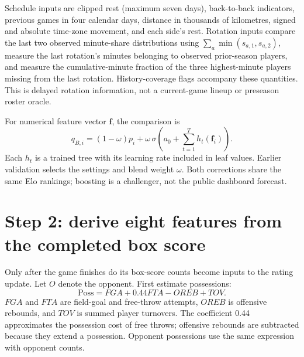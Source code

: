 \documentclass[11pt]{article}
\begin{document}
Schedule inputs are clipped rest (maximum seven days), back-to-back
indicators, previous games in four calendar days, distance in thousands of
kilometres, signed and absolute time-zone movement, and each side's rest.
Rotation inputs compare the last two observed minute-share distributions
using $\sum_a\min(s_{a,1},s_{a,2})$, measure the last rotation's minutes
belonging to observed prior-season players, and measure the cumulative-minute
fraction of the three highest-minute players missing from the last rotation.
History-coverage flags accompany these quantities. This is delayed rotation
information, not a current-game lineup or preseason roster oracle.

For numerical feature vector $\mathbf f$, the comparison is
\begin{equation}
 q_{B,i}=(1-\omega)p_i+\omega\,
 \sigma\!\left(a_0+\sum_{t=1}^{T}h_t(\mathbf f_i)\right).
\end{equation}
Each $h_t$ is a trained tree with its learning rate included in leaf values.
Earlier validation selects the settings and blend weight $\omega$. Both
corrections share the same Elo rankings; boosting is a challenger, not the
public dashboard forecast.

\section{Step 2: derive eight features from the completed box score}\label{sec:features}
Only after the game finishes do its box-score counts become inputs to the
rating update. Let $O$ denote the opponent. First estimate possessions:
\begin{equation}\label{eq:possessions}
 \mathrm{Poss}=FGA+0.44FTA-OREB+TOV.
\end{equation}
$FGA$ and $FTA$ are field-goal and free-throw attempts, $OREB$ is offensive
rebounds, and $TOV$ is summed player turnovers. The coefficient 0.44
approximates the possession cost of free throws; offensive rebounds are
subtracted because they extend a possession. Opponent possessions use the
same expression with opponent counts.
\end{document}
